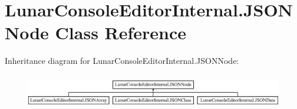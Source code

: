 \hypertarget{class_lunar_console_editor_internal_1_1_j_s_o_n_node}{}\section{Lunar\+Console\+Editor\+Internal.\+J\+S\+O\+N\+Node Class Reference}
\label{class_lunar_console_editor_internal_1_1_j_s_o_n_node}
Inheritance diagram for Lunar\+Console\+Editor\+Internal.\+J\+S\+O\+N\+Node\+:\begin{figure}[H]
\begin{center}
\leavevmode
\includegraphics[height=1.523810cm]{class_lunar_console_editor_internal_1_1_j_s_o_n_node}
\end{center}
\end{figure}
